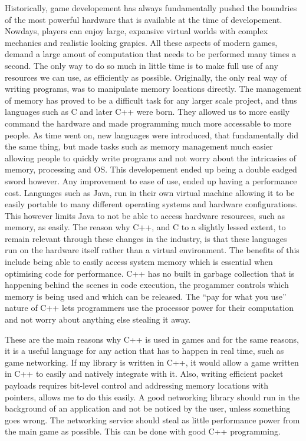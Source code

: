 Historically, game developement has always fundamentally pushed the boundries of the most powerful hardware that is available at the time of developement. Nowdays, players can enjoy large, expansive virtual worlds with complex mechanics and realistic looking grapics. All these aspects of modern games, demand a large amout of computation that needs to be performed many times a second. The only way to do so much in little time is to make full use of any resources we can use, as efficiently as possible. Originally, the only real way of writing programs, was to manipulate memory locations directly. The management of memory has proved to be a difficult task for any larger scale project, and thus languages such as C and later C++ were born. They allowed us to more easily command the hardware and made programming much more accessable to more people. As time went on, new languages were introduced, that fundamentally did the same thing, but made tasks such as memory management much easier allowing people to quickly write programs and not worry about the intricasies of memory, processing and OS. This developement ended up being a double eadged sword however. Any improvement to ease of use, ended up having a performance cost. Languages such as Java, run in their own virtual machine allowing it to be easily portable to many different operating systems and hardware configurations. This however limits Java to not be able to access hardware resources, such as memory, as easily. The reason why C++, and C to a slightly lessed extent, to remain relevant through these changes in the industry, is that these languages run on the hardware itself rather than a virtual environment. The benefits of this include being able to easily access system memory which is essential when optimising code for performance. C++ has no built in garbage collection that is happening behind the scenes in code execution, the progammer controls which memory is being used and which can be released. The ``pay for what you use'' nature of C++ lets programmers use the processor power for their computation and not worry about anything else stealing it away.

These are the main reasons why C++ is used in games and for the same reasons, it is a useful language for any action that has to happen in real time, such as game networking. If my library is written in C++, it would allow a game written in C++ to easily and natively integrate with it. Also, writing efficient packet payloads requires bit-level control and addressing memory locations with pointers, allows me to do this easily. A good networking library should run in the background of an application and not be noticed by the user, unless something goes wrong. The networking service should steal as little performance power from the main game as possible. This can be done with good C++ programming.


